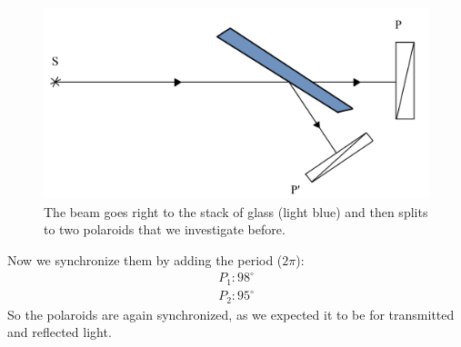 \begin{minipage}{0.55\textwidth}
    \begin{figure}[h]
    \centering
    \includegraphics[width=1\textwidth]{images/stoletov.png}
    \caption{The beam goes right to the stack of glass (light blue) and then splits to two polaroids that we investigate before.}
\end{figure}
\end{minipage}
\hfill
\begin{minipage}{0.35\textwidth}
    Now we synchronize them by adding the period ($2 \pi$):
    \begin{align*}
        P_1 \colon 98^\circ\\
        P_2 \colon 95^\circ
    \end{align*}
    So the polaroids are again synchronized, as we expected it to be for transmitted and reflected light.
\end{minipage}
